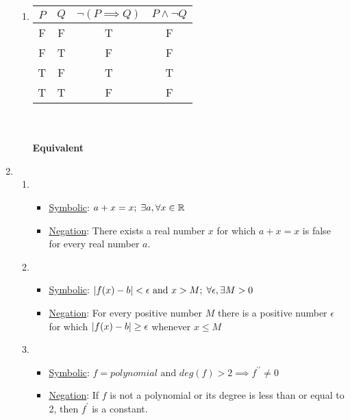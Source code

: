 \begin{enumerate}
\begin{enumerate}[label=(\alph*), itemsep=16pt]
                  \item
                        \begin{tabular}[t]{c|c|c|c}
                              $P$ & $Q$ & $\neg(P \implies Q)$ & $P \land\neg Q$ \\
                              \hline
                              F   & F   & T                    & F               \\
                              F   & T   & F                    & F               \\
                              T   & F   & T                    & T               \\
                              T   & T   & F                    & F
                        \end{tabular}
                        \\\\\textbf{Equivalent}
            \end{enumerate}
      \item
            \begin{enumerate}
                  \item
                        \begin{itemize}
                              \item \underline{Symbolic}: $a + x = x;\; \exists a, \forall x \in \operatorname{\mathbb{R}}$
                              \item \underline{Negation}: There exists a real number $x$ for which $a + x = x$ is false for every real number $a$.
                        \end{itemize}

                  \item
                        \begin{itemize}
                              \item \underline{Symbolic}: $\lvert {f(x) - b} \rvert < \epsilon \text{ and } x > M;\; \forall\epsilon, \exists M > 0$
                              \item \underline{Negation}: For every positive number $M$ there is a positive number $\epsilon$ for which $\lvert {f(x) - b} \rvert \ge \epsilon$ whenever $x \le M$
                        \end{itemize}

                  \item
                        \begin{itemize}
                              \item \underline{Symbolic}: $f=polynomial \text{ and } deg(f) > 2 \implies f^{\prime\prime} \neq 0$
                              \item \underline{Negation}: If $f$ is not a polynomial or its degree is less than or equal to 2, then $f^\prime$ is a constant.
                        \end{itemize}
            \end{enumerate}
\end{enumerate}

